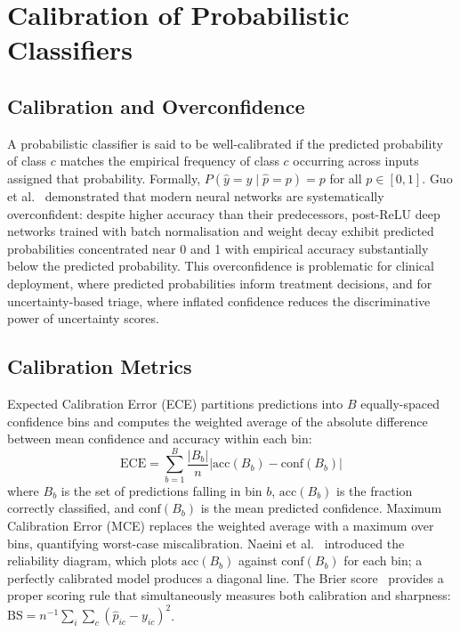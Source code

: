 \section{Calibration of Probabilistic Classifiers}

\subsection{Calibration and Overconfidence}

A probabilistic classifier is said to be well-calibrated if the predicted probability of class $c$ matches the empirical frequency of class $c$ occurring across inputs assigned that probability. Formally, $P(\hat{y} = y \mid \hat{p} = p) = p$ for all $p \in [0, 1]$. Guo et al.~\cite{guo2017calibration} demonstrated that modern neural networks are systematically overconfident: despite higher accuracy than their predecessors, post-ReLU deep networks trained with batch normalisation and weight decay exhibit predicted probabilities concentrated near 0 and 1 with empirical accuracy substantially below the predicted probability. This overconfidence is problematic for clinical deployment, where predicted probabilities inform treatment decisions, and for uncertainty-based triage, where inflated confidence reduces the discriminative power of uncertainty scores.

\subsection{Calibration Metrics}

Expected Calibration Error (ECE) partitions predictions into $B$ equally-spaced confidence bins and computes the weighted average of the absolute difference between mean confidence and accuracy within each bin:
\begin{equation}
    \text{ECE} = \sum_{b=1}^{B} \frac{|B_b|}{n} \left| \text{acc}(B_b) - \text{conf}(B_b) \right|
\end{equation}
where $B_b$ is the set of predictions falling in bin $b$, $\text{acc}(B_b)$ is the fraction correctly classified, and $\text{conf}(B_b)$ is the mean predicted confidence. Maximum Calibration Error (MCE) replaces the weighted average with a maximum over bins, quantifying worst-case miscalibration. Naeini et al.~\cite{naeini2015obtaining} introduced the reliability diagram, which plots $\text{acc}(B_b)$ against $\text{conf}(B_b)$ for each bin; a perfectly calibrated model produces a diagonal line. The Brier score~\cite{brier1950verification} provides a proper scoring rule that simultaneously measures both calibration and sharpness: $\text{BS} = n^{-1}\sum_i \sum_c (\hat{p}_{ic} - y_{ic})^2$.

